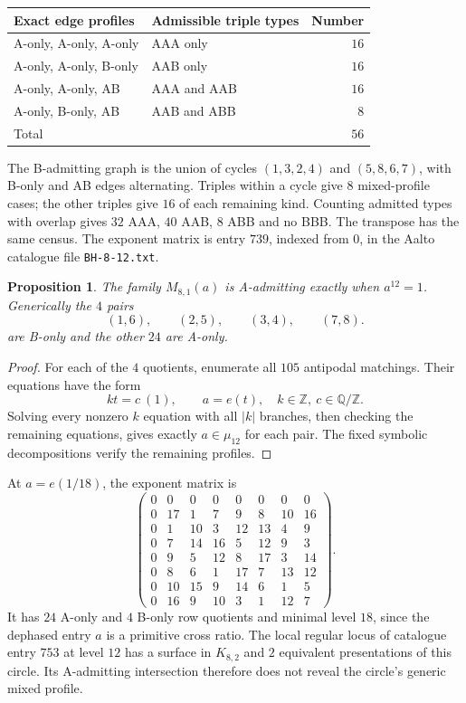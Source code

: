 \documentclass[11pt,a4paper]{article}
\newtheorem{proposition}[theorem]{Proposition}
\theoremstyle{plain}
\theoremstyle{definition}
\numberwithin{equation}{section}
\begin{document}
\begin{center}\begin{tabular}{llr}\toprule
Exact edge profiles&Admissible triple types&Number\\\midrule
A-only, A-only, A-only&AAA only&$16$\\
A-only, A-only, B-only&AAB only&$16$\\
A-only, A-only, AB&AAA and AAB&$16$\\
A-only, B-only, AB&AAB and ABB&$8$\\\midrule
Total&&$56$\\\bottomrule
\end{tabular}\end{center}
The B-admitting graph is the union of cycles $(1,3,2,4)$ and $(5,8,6,7)$, with B-only and AB edges alternating. Triples within a cycle give $8$ mixed-profile cases; the other triples give $16$ of each remaining kind. Counting admitted types with overlap gives $32$ AAA, $40$ AAB, $8$ ABB and no BBB. The transpose has the same census. The exponent matrix is entry $739$, indexed from $0$, in the Aalto catalogue file \texttt{BH-8-12.txt}.

\begin{proposition}
The family $M_{8,1}(a)$ is A-admitting exactly when $a^{12}=1$. Generically the $4$ pairs
$$(1,6),\qquad(2,5),\qquad(3,4),\qquad(7,8).$$
are B-only and the other $24$ are A-only.
\end{proposition}
\begin{proof}
For each of the $4$ quotients, enumerate all $105$ antipodal matchings. Their equations have the form
$$k t=c\ (1),\qquad a=e(t),\quad k\in\mathbb{Z},\ c\in\mathbb{Q}/\mathbb{Z}.$$
Solving every nonzero $k$ equation with all $|k|$ branches, then checking the remaining equations, gives exactly $a\in\mu_{12}$ for each pair. The fixed symbolic decompositions verify the remaining profiles.
\end{proof}
At $a=e(1/18)$, the exponent matrix is
$$
\begin{pmatrix}
0 & 0 & 0 & 0 & 0 & 0 & 0 & 0 \\
0 & 17 & 1 & 7 & 9 & 8 & 10 & 16 \\
0 & 1 & 10 & 3 & 12 & 13 & 4 & 9 \\
0 & 7 & 14 & 16 & 5 & 12 & 9 & 3 \\
0 & 9 & 5 & 12 & 8 & 17 & 3 & 14 \\
0 & 8 & 6 & 1 & 17 & 7 & 13 & 12 \\
0 & 10 & 15 & 9 & 14 & 6 & 1 & 5 \\
0 & 16 & 9 & 10 & 3 & 1 & 12 & 7
\end{pmatrix}.
$$
It has $24$ A-only and $4$ B-only row quotients and minimal level $18$, since the dephased entry $a$ is a primitive cross ratio. The local regular locus of catalogue entry $753$ at level $12$ has a surface in $K_{8,2}$ and $2$ equivalent presentations of this circle. Its A-admitting intersection therefore does not reveal the circle's generic mixed profile.
\end{document}
